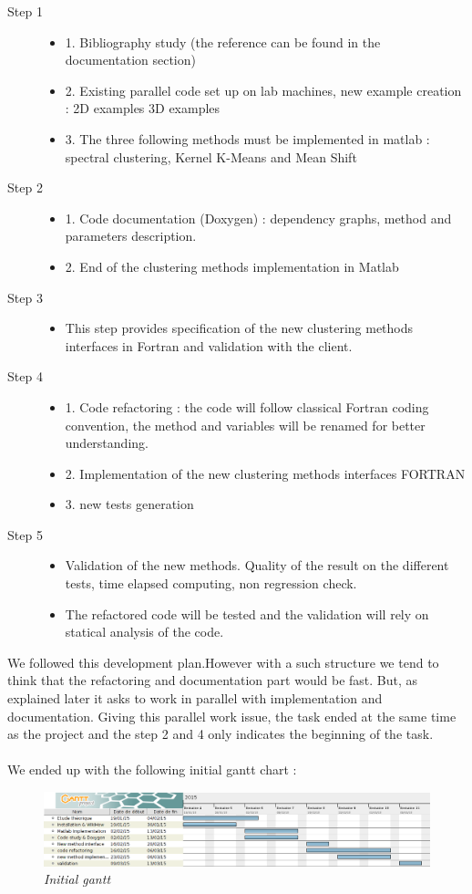 \begin{description}
\item[Step 1]
	\begin{itemize}
	\item 1. Bibliography study (the reference can be found in the documentation section)
 	\item 2. Existing parallel code set up on lab machines, new example creation : 2D examples 3D examples
	\item 3. The three following methods must be implemented in matlab : spectral clustering, Kernel K-Means and Mean Shift        
	\end{itemize} 
\item[Step 2]
	\begin{itemize}
	\item 1. Code documentation (Doxygen) : dependency graphs, method and parameters description.
	\item 2. End of the clustering methods implementation in Matlab
	\end{itemize}
\item[Step 3]
	\begin{itemize}
	\item This step provides specification of the new clustering methods interfaces in Fortran  and validation with the client.
	\end{itemize}
\item[Step 4]
	\begin{itemize}
	\item 1. Code refactoring : the code will follow classical Fortran coding convention, the method and variables will be renamed for better understanding.
	\item 2. Implementation of the new clustering methods interfaces FORTRAN
	\item 3. new tests generation
	\end{itemize}
\item[Step 5]
	\begin{itemize}
	\item Validation of the new methods. Quality of the result on the different tests, time elapsed computing, non regression check.
	\item The refactored code will be tested and the validation will rely on statical analysis of the code.
	\end{itemize}
\end{description}


We followed this development plan.However with a such structure we tend to think that the refactoring and documentation part would be fast. But, as explained later it asks to work in parallel with implementation and documentation. Giving this parallel work issue, the task ended at the same time as the project and the step 2 and 4 only indicates the beginning of the task.
 \\
 \\
 
  
 We ended up with the following initial gantt chart :
 
 \begin{figure}[h!]
\includegraphics[width=1\textwidth]{Image/gantt.png}\centering
\caption{\textit{Initial gantt}}
\end{figure}
